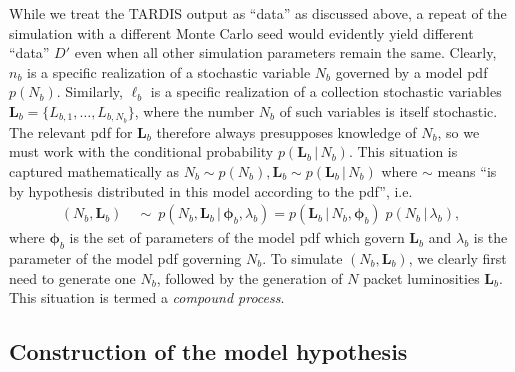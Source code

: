 \documentclass[11pt]{article}
\newcommand{\cond}{\,|\,}
\newcommand{\smN}{{\scriptscriptstyle N}}
\newcommand{\bml}{{\bm{\ell}}}
\newcommand{\bmL}{{\bm{L}}}
\newcommand{\bmphi}{{\bm{\phi}}}
\begin{document}
While we treat the TARDIS output as ``data'' as discussed above, a
repeat of the simulation with a different Monte Carlo seed would
evidently yield different ``data'' $D'$ even when all other simulation
parameters remain the same. Clearly, $n_b$ is a specific realization
of a stochastic variable $N_b$ governed by a model pdf
$p(N_b)$. Similarly, $\bml_b$ is a specific realization of a
collection stochastic variables $\bmL_b
=\{L_{b,1},\ldots,L_{b,\smN_b}\}$, where the number $N_b$ of such
variables is itself stochastic. The relevant pdf for $\bmL_b$
therefore always presupposes knowledge of $N_b$, so we must work with
the conditional probability $p(\bmL_b\cond N_b)$. This situation is
captured mathematically as $N_b \sim p(N_b), \bmL_b \sim p(\bmL_b\cond
N_b)$ where $\sim$ means ``is by hypothesis distributed in this model
according to the pdf'', i.e.\
\begin{align*}
  (N_b,\bmL_b) &\ \sim\ p(N_b,\bmL_b\cond \bmphi_b,\lambda_b)
  = p(\bmL_b\cond N_b,\bmphi_b)\; p(N_b\cond \lambda_b),
\end{align*}
where $\bmphi_b$ is the set of parameters of the model pdf which
govern $\bmL_b$ and $\lambda_b$ is the parameter of the model pdf
governing $N_b$.  To simulate $(N_b,\bmL_b)$, we clearly first need to
generate one $N_b$, followed by the generation of $N$ packet
luminosities $\bmL_b$. This situation is termed a \textit{compound
  process}.

\subsection{Construction of the model hypothesis}
\end{document}

